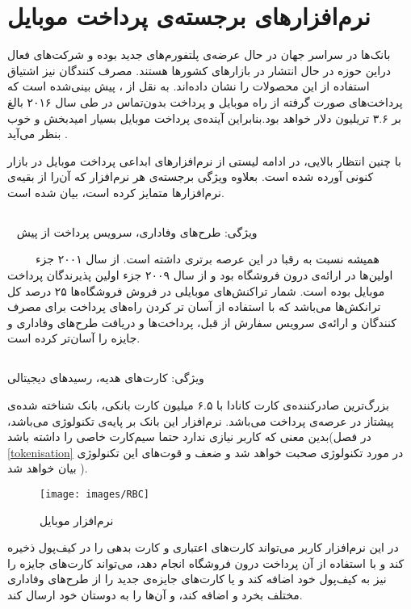 \documentclass[oneside]{report}
\begin{document}
	\section{‌‌نرم‌افزار‌های برجسته‌ی پرداخت موبایل }		
		بانک‌ها در سراسر جهان در حال عرضه‌ی پلتفورم‌های جدید بوده و شرکت‌های فعال دراین حوزه در حال انتشار در بازار‌های کشورها هستند. مصرف کنندگان نیز اشتیاق استفاده از این محصولات را نشان داده‌اند. 
	به نقل از 
			 									 {\normalsize {}}،   پیش بینی‌شده است که پرداخت‌های صورت گرفته از راه موبایل و پرداخت بدون‌تماس در طی سال ۲۰۱۶  بالغ بر ۳.۶ تریلیون دلار خواهد بود.بنابراین آینده‌ی پرداخت موبایل بسیار امید‌بخش و خوب بنظر می‌آید
	\cite{juniperresearch}.
			 									 
			 									 با چنین انتظار بالایی، در ادامه  لیستی از نرم‌افزار‌های ابداعی پرداخت موبایل در بازار کنونی  آورده شده است. بعلاوه  ویژگی برجسته‌ی هر نرم‌افزار که آن‌را از بقیه‌ی نرم‌افزار‌ها متمایز کرده است،  بیان شده است.
	\subsection{ {\small {}}}
		 			 									 ویژگی: طرح‌های وفاداری، سرویس پرداخت از پیش
	
	 			 				 {\normalsize {}}	 			 									 
	 	 همیشه نسبت به رقبا در این عرصه برتری داشته است. از سال ۲۰۰۱ جزء اولین‌ها در ارائه‌ی {\normalsize {}} درون فروشگاه بود و از سال ۲۰۰۹ جزء اولین پذیرندگان پرداخت موبایل بوده است. شمار تراکنش‌های موبایلی در فروش فروشگاه‌ها ۲۵ درصد کل ترانکش‌ها می‌باشد که با استفاده از آسان تر کردن راه‌های پرداخت برای مصرف کنندگان و ارائه‌ی سرویس سفارش از قبل، پرداخت‌ها و دریافت طرح‌های وفاداری و جایزه را آسان‌تر کرده است. 
	 	 			 									 
		\subsection{ {\small {}}}
		ویژگی: کارت‌های هدیه، رسید‌های دیجیتالی
		
		بزرگ‌ترین  صادرکننده‌ی کارت
		 کانادا با ۶.۵ میلیون کارت بانکی، بانک شناخته شده‌ی پیشتاز در عرصه‌ی پرداخت می‌باشد. نرم‌افزار این بانک بر پایه‌ی تکنولوژی 			
	 {\normalsize {}} 	 
	 می‌باشد، بدین معنی که کاربر نیازی ندارد حتما سیم‌کارت خاصی را داشته باشد(در فصل 
	 \ref{tokenisation}
	 در مورد تکنولوژی 
	 {\normalsize {}} 
	 صحبت خواهد شد و ضعف و قوت‌های این تکنولوژی بیان خواهد شد
	 ).
	
	\begin{figure}[h]
		\centering
		\texttt{[image: images/RBC]}
		\caption{نرم‌افزار موبایل 	{\normalsize {}}}
		\label{fig:rbc}
	\end{figure}
در این نرم‌افزار کاربر می‌تواند کارت‌‌های اعتباری 
و کارت بدهی 
		را در کیف‌پول ذخیره کند و با استفاده از آن پرداخت درون فروشگاه انجام دهد،  می‌تواند کارت‌های جایزه را نیز به کیف‌پول خود اضافه کند و یا کارت‌های جایزه‌ی جدید را از طرح‌های وفاداری مختلف بخرد و اضافه کند، و آن‌ها را به دوستان خود ارسال کند.
		
\end{document}
